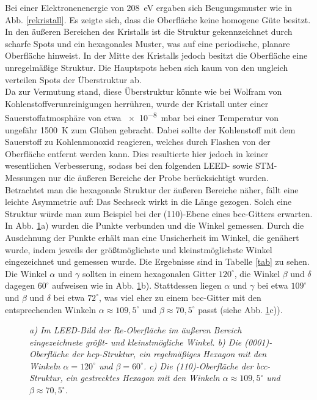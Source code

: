  Bei einer Elektronenenergie von \SI{208}{eV} ergaben sich Beugungsmuster wie in Abb.
 \ref{rekristall}.
Es zeigte sich, dass die Oberfläche keine homogene Güte besitzt. In den äußeren Bereichen des
Kristalls ist die Struktur gekennzeichnet durch scharfe Spots und ein hex\-agonales
Muster, was auf eine periodische, planare Oberfläche hinweist. In der Mitte des Kristalls jedoch
besitzt die Oberfläche eine unregelmäßige Struktur. Die Hauptspots heben sich kaum von den ungleich
verteilen Spots der Überstruktur ab.
\\
Da zur Vermutung stand, diese Überstruktur könnte wie bei Wolfram von Kohlenstoffverunreinigungen
herrühren, wurde der Kristall unter einer Sauerstoffatmosphäre von etwa \SI{e-8}{mbar} bei einer
Temperatur von ungefähr \SI{1500}{K} zum Glühen gebracht. Dabei sollte der Kohlenstoff mit dem
Sauerstoff zu Kohlenmonoxid reagieren, welches durch Flashen von der Oberfläche entfernt werden kann. Dies
resultierte hier jedoch in keiner wesentlichen Verbesserung, sodass bei den folgenden LEED- sowie
STM-Messungen nur die äußeren Bereiche der Probe berücksichtigt wurden.
\\
Betrachtet man die hexagonale Struktur der äußeren Bereiche näher, fällt eine leichte Asymmetrie
auf: Das Sechseck wirkt in die Länge gezogen. Solch eine Struktur würde man zum Beispiel bei
der (110)-Ebene eines bcc-Gitters erwarten. In Abb. \ref{winkel}a) wurden die Punkte verbunden und
die Winkel gemessen. Durch die Ausdehnung der Punkte erhält man eine Unsicherheit im Winkel, die
genähert wurde, indem jeweils der größtmöglichste und kleinstmöglichste Winkel eingezeichnet und
gemessen wurde. Die Ergebnisse sind in Tabelle \ref{tab} zu sehen. Die Winkel $\alpha$ und $\gamma$
sollten in einem hexagonalen Gitter $120^{\circ}$, die Winkel $\beta$ und $\delta$ dagegen
$60^{\circ}$ aufweisen wie in Abb. \ref{winkel}b). Stattdessen liegen $\alpha$ und $\gamma$ bei etwa
$109^{\circ}$ und $\beta$ und $\delta$ bei etwa $72^{\circ}$, was viel eher zu einem bcc-Gitter mit
den entsprechenden Winkeln $\alpha\approx109{,}5^{\circ}$ und $\beta\approx70{,}5^{\circ}$ passt
(siehe Abb. \ref{winkel}c)).

\begin{figure}[H]
\begin{minipage}[b]{0.45\textwidth}

\end{minipage}
\begin{minipage}[b]{0.45\textwidth}

\end{minipage}
\caption{\textit{a) Im LEED-Bild der Re-Oberfläche im äußeren Bereich eingezeichnete größt- und
kleinstmögliche Winkel. b) Die (0001)-Oberfläche der hcp-Struktur, ein regelmäßiges Hexagon mit den
Winkeln $\alpha=120^{\circ}$ und $\beta=60^{\circ}$. c) Die (110)-Oberfläche der bcc-Struktur, ein
gestrecktes Hexagon mit den Winkeln $\alpha\approx109{,}5^{\circ}$ und
$\beta\approx70{,}5^{\circ}$.}}
\label{winkel} 
\end{figure}








